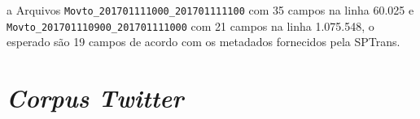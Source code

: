 \documentclass[
	12pt,				%
	oneside,			%
	a4paper,			%
	english,			%
	brazil				%
	]{abntex2ppgsi}
\begin{document}
{{{\begin{table}[!htb]
\begin{threeparttable}
\begin{tablenotes}
\item[a] Arquivos  \texttt{Movto\_201701111000\_201701111100} com 35 campos na linha 60.025 e \texttt{Movto\_201701110900\_201701111000} com 21 campos na linha 1.075.548, o esperado são 19 campos de acordo com os metadados fornecidos pela SPTrans.
\end{tablenotes}
\end{threeparttable}
\end{table}


\clearpage
 
\section{\textit{Corpus Twitter}}


}}}
\end{document}
